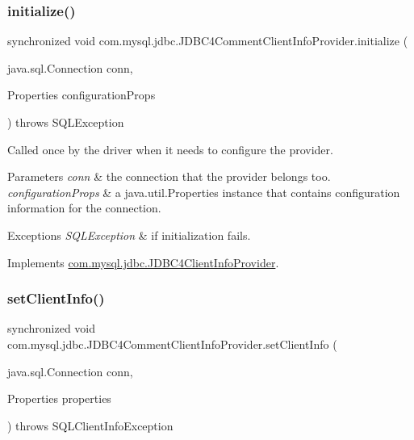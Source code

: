 \subsubsection{\texorpdfstring{initialize()}{initialize()}}
{\footnotesize\ttfamily synchronized void com.\+mysql.\+jdbc.\+J\+D\+B\+C4\+Comment\+Client\+Info\+Provider.\+initialize (\begin{DoxyParamCaption}\item[{java.\+sql.\+Connection}]{conn,  }\item[{Properties}]{configuration\+Props }\end{DoxyParamCaption}) throws S\+Q\+L\+Exception}

Called once by the driver when it needs to configure the provider.


\begin{DoxyParams}{Parameters}
{\em conn} & the connection that the provider belongs too. \\
\hline
{\em configuration\+Props} & a java.\+util.\+Properties instance that contains configuration information for the connection. \\
\hline
\end{DoxyParams}

\begin{DoxyExceptions}{Exceptions}
{\em S\+Q\+L\+Exception} & if initialization fails. \\
\hline
\end{DoxyExceptions}


Implements \mbox{\hyperlink{interfacecom_1_1mysql_1_1jdbc_1_1_j_d_b_c4_client_info_provider_a6101402e08a2e2062be166fce41ffd71}{com.\+mysql.\+jdbc.\+J\+D\+B\+C4\+Client\+Info\+Provider}}.

\mbox{\label{classcom_1_1mysql_1_1jdbc_1_1_j_d_b_c4_comment_client_info_provider_aa859dc068c85908783e59566c2ba32cf}} 
\subsubsection{\texorpdfstring{set\+Client\+Info()}{setClientInfo()}\hspace{0.1cm}{\footnotesize\ttfamily [1/2]}}
{\footnotesize\ttfamily synchronized void com.\+mysql.\+jdbc.\+J\+D\+B\+C4\+Comment\+Client\+Info\+Provider.\+set\+Client\+Info (\begin{DoxyParamCaption}\item[{java.\+sql.\+Connection}]{conn,  }\item[{Properties}]{properties }\end{DoxyParamCaption}) throws S\+Q\+L\+Client\+Info\+Exception}

